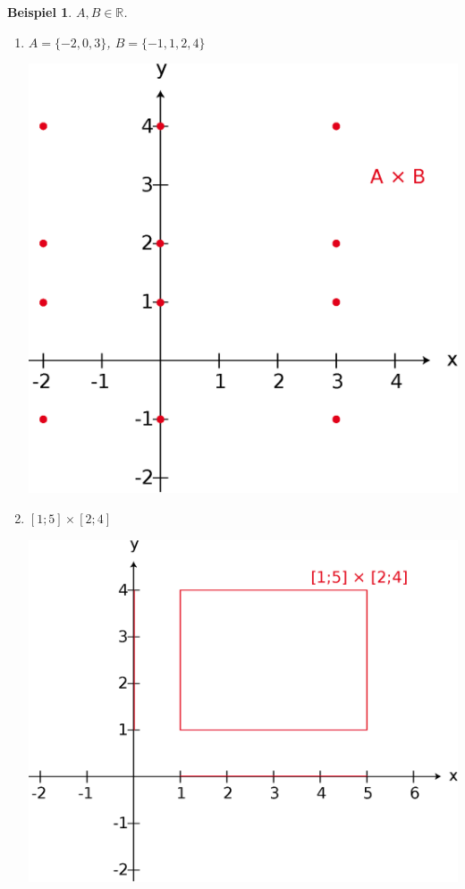 \documentclass{report}
\newtheorem{myexample}{Beispiel}
\begin{document}
\begin{myexample}$A, B \in \mathbb{R}$.\begin{enumerate}\item $A = \{-2, 0, 3\}$, $B = \{-1, 1, 2, 4\}$
\begin{center}\includegraphics[scale=0.25]{img/2_5-example-1.eps}\end{center}
\item $[1;5] \times [2;4]$
\begin{center}\includegraphics[scale=0.25]{img/2_5-example-2.eps}\end{center}

\end{enumerate}
\end{myexample}
\end{document}
